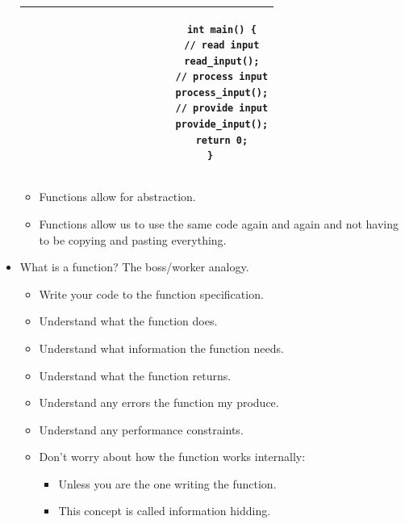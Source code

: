 \begin{itemize}
\begin{center}
\begin{tabular}{ |c|c| }
\begin{verbatim}
                    \end{verbatim}
                    & 
                    \begin{verbatim}
                        int main() {
                        // read input
                        read_input();
                        // process input
                        process_input();
                        // provide input
                        provide_input();
                        return 0;
                    }
                    \end{verbatim} \\ 
                \hline
            \end{tabular}
        \end{center}
        \begin{itemize}
            \item Functions allow for abstraction.
            \item Functions allow us to use the same code again and again and not having to be copying and pasting everything.
        \end{itemize}
    
    \item What is a function? The boss/worker analogy.
        \begin{itemize}
            \item Write your code to the function specification.
            \item Understand what the function does.
            \item Understand what information the function needs.
            \item Understand what the function returns.
            \item Understand any errors the function my produce.
            \item Understand any performance constraints.
            \item Don't worry about how the function works internally:
                \begin{itemize}
                    \item Unless you are the one writing the function.
                    \item This concept is called information hidding.
                \end{itemize}
        \end{itemize}
    

\end{itemize}

